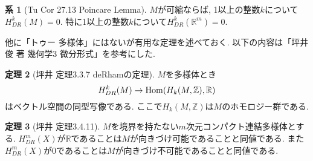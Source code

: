 \documentclass[dvipdfmx,a4paper,11pt]{article}
\newcommand{\R}{\mathbb{R}}
\newcommand{\Z}{\mathbb{Z}}
\theoremstyle{definition}
\newtheorem{thm}{定理}
\newtheorem{cor}[thm]{系}
\begin{document}
\begin{tcolorbox}[
    colback = white,
    colframe = green!35!black,
    fonttitle = \bfseries,
    breakable = true]
\begin{cor}[Tu Cor 27.13 Poincare Lemma]
$M$が可縮ならば, 1以上の整数$k$について$H^{k}_{DR}(M) =0$. 
特に1以上の整数$k$について$H^{k}_{DR}(\R^m) =0$.
\end{cor}
\end{tcolorbox} 

他に「トゥー 多様体」にはないが有用な定理を述べておく. 
 以下の内容は「坪井俊 著 幾何学3 微分形式」を参考にした.
 
 
\begin{tcolorbox}[
    colback = white,
    colframe = green!35!black,
    fonttitle = \bfseries,
    breakable = true]
\begin{thm}[坪井 定理3.3.7 deRhamの定理]
$M$を多様体とき
$$ H^{k}_{DR}(M) \to {\rm Hom} (H_{k}(M,\Z), \R)
$$
はベクトル空間の同型写像である. 
ここで$H_{k}(M,\Z)$は$M$のホモロジー群である. 
\end{thm}
\end{tcolorbox} 

\begin{tcolorbox}[
    colback = white,
    colframe = green!35!black,
    fonttitle = \bfseries,
    breakable = true]
\begin{thm}[坪井 定理3.4.11]
$M$を境界を持たない$m$次元コンパクト連結多様体とする. 
$H^{m}_{DR}(X)$が$\R$であることは$M$が向きづけ可能であることと同値である. 
また$H^{m}_{DR}(X)$が$0$であることは$M$が向きづけ不可能であることと同値である. 
\end{thm}
\end{tcolorbox} 
\end{document}
